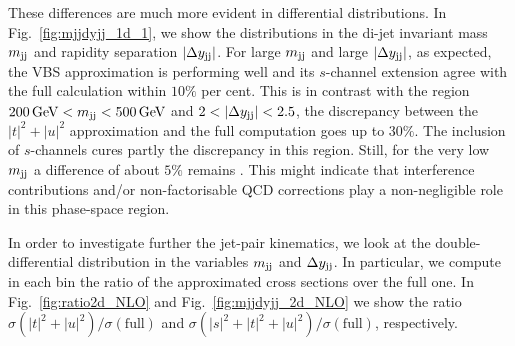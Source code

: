 These differences are much more evident in differential distributions.
In Fig.~\ref{fig:mjjdyjj_1d_1}, we show the distributions in the di-jet invariant mass $m_{\text{j}\text{j}}$ and rapidity separation $|\Delta y_{\text{j}\text{j}}|$.
For large $m_{\text{j}\text{j}}$ and large $|\Delta y_{\text{j}\text{j}}|$, as expected, the VBS approximation is performing well and its $s$-channel extension agree with the full calculation within $10\%$ per cent.
This is in contrast with the region  $200 \,\text{GeV} < m_{\text{j}\text{j}} < 500 \,\text{GeV}$ and $2<|\Delta y_{\Pj\Pj}|<2.5$, the discrepancy between the $|t|^2 + |u|^2$ approximation and the full computation goes up to $30\%$.
The inclusion of $s$-channels cures partly the discrepancy in this region.
Still, for the very low $m_{\text{j}\text{j}}$ a difference of about $5\%$ remains .
This might indicate that interference contributions and/or non-factorisable QCD corrections play a non-negligible role in this phase-space region.

In order to investigate further the jet-pair kinematics, we look at the double-differential distribution in the variables $m_{\text{j}\text{j}}$ and $\Delta y_{\text{j}\text{j}}$.
In particular, we compute in each bin the ratio of the approximated cross sections over the full one.
In Fig.~\ref{fig:ratio2d_NLO} and Fig.~\ref{fig:mjjdyjj_2d_NLO} we show the ratio $\sigma(|t|^2 + |u|^2)/\sigma(\textrm{full})$ and $\sigma(|s|^2+|t|^2 + |u|^2)/\sigma(\textrm{full})$, respectively.


